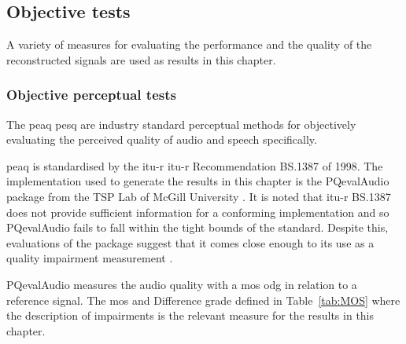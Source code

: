 \subsection{Objective tests}
A variety of measures for evaluating the performance and the quality of the reconstructed signals are used as results in this chapter.
\subsubsection{Objective perceptual tests}
The \DIFdelbegin {}\DIFdelend \DIFaddbegin \gls{peaq} \gls{pesq} \DIFaddend are industry standard perceptual methods for objectively evaluating the perceived quality of audio and speech specifically.

\DIFdelbegin {}\DIFdelend \DIFaddbegin \gls{peaq} \DIFaddend is standardised by the \DIFdelbegin {}\DIFdelend \DIFaddbegin \gls{itu-r} \gls{itu-r} \DIFaddend Recommendation BS.1387 \cite{BS-1387-1998} of 1998. The implementation used to generate the results in this chapter is the PQevalAudio package from the TSP Lab of McGill University \cite{Kabal2003}. It is noted that \DIFdelbegin {}\DIFdelend \DIFaddbegin \gls{itu-r} \DIFaddend BS.1387 does not provide sufficient information for a conforming implementation \cite{Campeanu2005} and so PQevalAudio fails to fall within the tight bounds of the standard. Despite this, evaluations of the package suggest that it comes close enough to \DIFdelbegin {}\DIFdelend \DIFaddbegin {}\DIFaddend its use as a quality impairment measurement \cite{Kabal2003}.

PQevalAudio measures the audio quality with a \DIFdelbegin {}\DIFdelend \DIFaddbegin \gls{mos} \gls{odg} \DIFaddend in relation to a reference signal. The \DIFdelbegin {}\DIFdelend \DIFaddbegin \gls{mos}\DIFaddend \cite{P-800-1996} and Difference grade \cite{Kabal2003} \DIFdelbegin {}\DIFdelend \DIFaddbegin {}\DIFaddend defined in Table~\ref{tab:MOS} where the description of impairments is the relevant measure for the results in this chapter.

